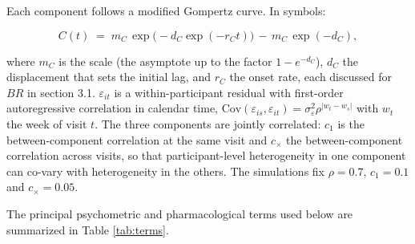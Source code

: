 \documentclass[
  11pt,
]{article}
\begin{document}
Each component follows a modified Gompertz curve. In symbols:

\[ C(t) \;=\; m_C \,\exp\bigl(-d_C \exp(-r_C t)\bigr) \,-\, m_C\,\exp(-d_C),
\]

where \(m_C\) is the scale (the asymptote up to the factor \(1 - e^{-d_C}\)),
\(d_C\) the displacement that sets the initial lag, and \(r_C\) the onset
rate, each discussed for \(BR\) in section 3.1. \(\varepsilon_{it}\) is a
within-participant residual with first-order autoregressive correlation
in calendar time, \(\mathrm{Cov}(\varepsilon_{is}, \varepsilon_{it}) =
\sigma^2_\varepsilon \rho^{|w_t - w_s|}\) with \(w_t\) the week of visit
\(t\). The three components are jointly correlated: \(c_1\) is the
between-component correlation at the same visit and \(c_\times\) the
between-component correlation across visits, so that participant-level
heterogeneity in one component can co-vary with heterogeneity in the
others. The simulations fix \(\rho = 0.7\), \(c_1 = 0.1\) and
\(c_\times = 0.05\).

The principal psychometric and pharmacological terms used below
are summarized in Table \ref{tab:terms}.
\end{document}
